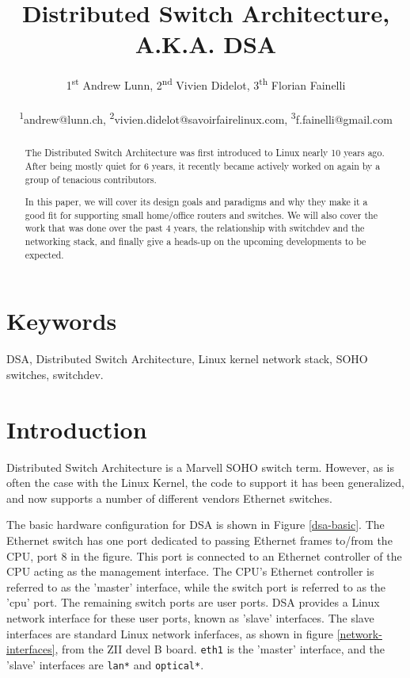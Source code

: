 \documentclass[letterpaper]{article}
\title{Distributed Switch Architecture,\\ A.K.A. DSA}
\author{1\textsuperscript{st} Andrew Lunn, 2\textsuperscript{nd} Vivien Didelot,  3\textsuperscript{th} Florian Fainelli\\
  \\
  \textsuperscript{1}andrew@lunn.ch,
  \textsuperscript{2}vivien.didelot@savoirfairelinux.com,
  \textsuperscript{3}f.fainelli@gmail.com\\
}
\begin{document}
\maketitle
\begin{abstract}

  The Distributed Switch Architecture was first introduced to Linux
  nearly 10 years ago. After being mostly quiet for 6 years, it
  recently became actively worked on again by a group of tenacious
  contributors.

  In this paper, we will cover its design goals and paradigms and why
  they make it a good fit for supporting small home/office routers and
  switches. We will also cover the work that was done over the past 4
  years, the relationship with switchdev and the networking stack, and
  finally give a heads-up on the upcoming developments to be expected.
\end{abstract}

\section{Keywords}

DSA, Distributed Switch Architecture, Linux kernel network stack, SOHO
switches, switchdev.

\section{Introduction}

Distributed Switch Architecture is a Marvell SOHO switch
term. However, as is often the case with the Linux Kernel, the code to
support it has been generalized, and now supports a number of
different vendors Ethernet switches.

The basic hardware configuration for DSA is shown in Figure
\ref{dsa-basic}. The Ethernet switch has one port dedicated to passing
Ethernet frames to/from the CPU, port 8 in the figure. This port is
connected to an Ethernet controller of the CPU acting as the
management interface. The CPU's Ethernet controller is referred to as
the 'master' interface, while the switch port is referred to as the
'cpu' port. The remaining switch ports are user ports. DSA provides a
Linux network interface for these user ports, known as 'slave'
interfaces. The slave interfaces are standard Linux network
inferfaces, as shown in figure \ref{network-interfaces}, from the ZII
devel B board.  \verb|eth1| is the 'master' interface, and the 'slave'
interfaces are \verb|lan*| and \verb|optical*|.
\end{document}
